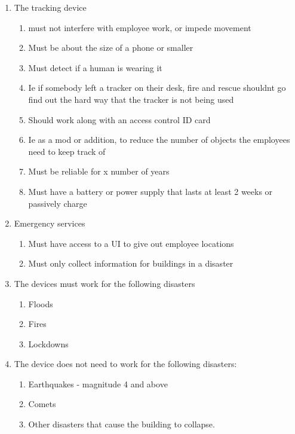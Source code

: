 	\begin{enumerate}
		\item The tracking device
			\begin{enumerate}
				\item must not interfere with employee work, or impede movement
				\item Must be about the size of a phone or smaller
				\item Must detect if a human is wearing it
				\item Ie if somebody left a tracker on their desk,
					fire and rescue shouldnt go find out the hard way that the tracker is not being used
				\item Should work along with an access control ID card
				\item Ie as a mod or addition, to reduce the number of objects the employees need to keep track of
				\item Must be reliable for x number of years
				\item Must have a battery or power supply that lasts at least 2 weeks or passively charge
			\end{enumerate}


		\item Emergency services
			\begin{enumerate}
				\item Must have access to a UI to give out employee locations
				\item Must only collect information for buildings in a disaster
			\end{enumerate}


		\item The devices must work for the following disasters
			\begin{enumerate}
				\item Floods
				\item Fires
				\item Lockdowns
			\end{enumerate}
		\item The device does not need to work for the following disasters:
			\begin{enumerate}
				\item Earthquakes - magnitude 4 and above
				\item Comets
				\item Other disasters that cause the building to collapse.
			\end{enumerate}
	\end{enumerate}

